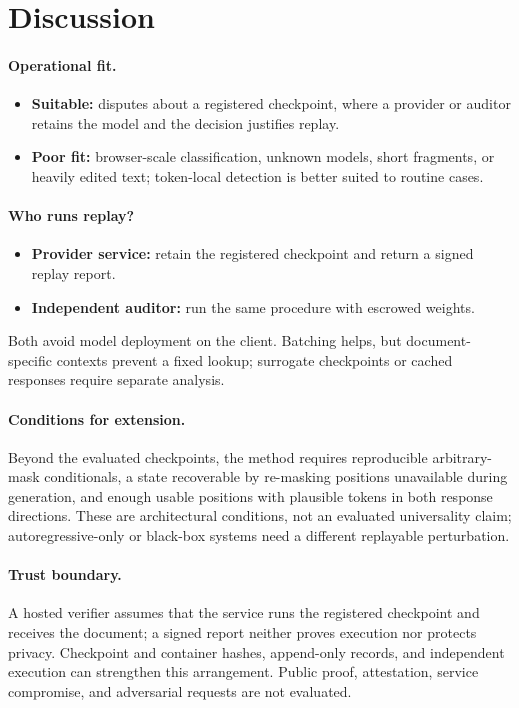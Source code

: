\section{Discussion}
\label{sec:discussion}

\paragraph{Operational fit.}
\begin{itemize}[leftmargin=1.2em,itemsep=0pt,topsep=1pt]
\item \textbf{Suitable:} disputes about a registered checkpoint, where a provider or auditor retains
the model and the decision justifies replay.
\item \textbf{Poor fit:} browser-scale classification, unknown models, short fragments, or heavily
edited text; token-local detection is better suited to routine cases.
\end{itemize}

\paragraph{Who runs replay?}
\begin{itemize}[leftmargin=1.2em,itemsep=0pt,topsep=1pt]
\item \textbf{Provider service:} retain the registered checkpoint and return a signed replay report.
\item \textbf{Independent auditor:} run the same procedure with escrowed weights.
\end{itemize}
Both avoid model deployment on the client. Batching helps, but document-specific contexts prevent
a fixed lookup; surrogate checkpoints or cached responses require separate analysis.

\paragraph{Conditions for extension.}
Beyond the evaluated checkpoints, the method requires reproducible arbitrary-mask conditionals,
a state recoverable by re-masking positions unavailable during generation, and enough usable
positions with plausible tokens in both response directions. These are architectural conditions,
not an evaluated universality claim; autoregressive-only or black-box systems need a different
replayable perturbation.

\paragraph{Trust boundary.}
A hosted verifier assumes that the service runs the registered checkpoint and receives the document;
a signed report neither proves execution nor protects privacy. Checkpoint and container hashes,
append-only records, and independent execution can strengthen this arrangement. Public proof,
attestation, service compromise, and adversarial requests are not evaluated.

